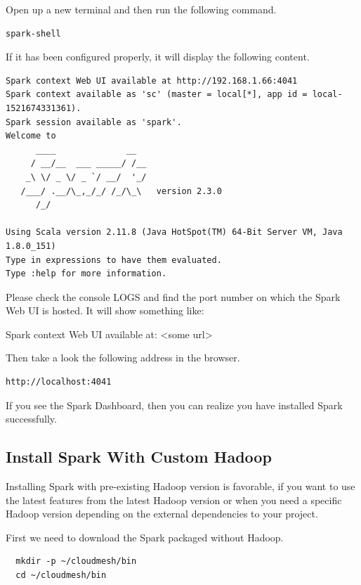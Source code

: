 Open up a new terminal and then run the following command.

\begin{lstlisting}
spark-shell
\end{lstlisting}

If it has been configured properly, it will display the following content.

\begin{lstlisting}
Spark context Web UI available at http://192.168.1.66:4041
Spark context available as 'sc' (master = local[*], app id = local-1521674331361).
Spark session available as 'spark'.
Welcome to
      ____              __
     / __/__  ___ _____/ /__
    _\ \/ _ \/ _ `/ __/  '_/
   /___/ .__/\_,_/_/ /_/\_\   version 2.3.0
      /_/
         
Using Scala version 2.11.8 (Java HotSpot(TM) 64-Bit Server VM, Java 1.8.0_151)
Type in expressions to have them evaluated.
Type :help for more information.
\end{lstlisting}

\begin{NOTE}
  Please check the console LOGS and find the port number on which the
  Spark Web UI is hosted. It will show something like:

  Spark context Web UI available at: <some url>
\end{NOTE}

Then take a look the following address in the browser.
\begin{lstlisting}
http://localhost:4041
\end{lstlisting}

If you see the Spark Dashboard, then you can realize you have installed Spark
successfully.

\subsection{Install Spark With Custom Hadoop}

Installing Spark with pre-existing Hadoop version is favorable, if you
want to use the latest features from the latest Hadoop version or when
you need a specific Hadoop version depending on the external
dependencies to your project.

First we need to download the Spark packaged without Hadoop.

\begin{lstlisting}
  mkdir -p ~/cloudmesh/bin
  cd ~/cloudmesh/bin
\end{lstlisting}
  
